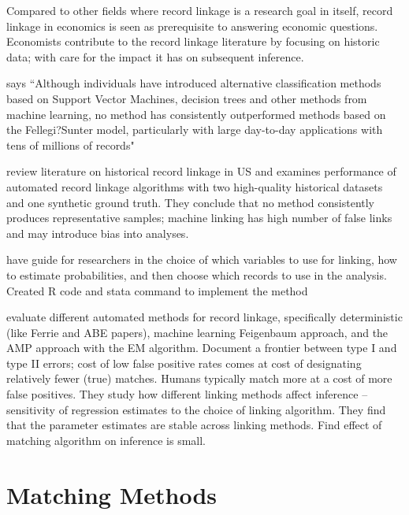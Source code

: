 \documentclass[12pt]{article}
\begin{document}
Compared to other fields where record linkage is a research goal in itself, record linkage in economics is seen as prerequisite to answering economic questions.  Economists contribute to the record linkage literature by focusing on historic data; with care for the impact it has on subsequent inference.   

\cite{christen2012} says ``Although individuals have introduced alternative classification methods based on Support Vector Machines, decision trees and other
methods from machine learning, no method has consistently outperformed methods
based on the Fellegi?Sunter model, particularly with large day-to-day applications
with tens of millions of records"

\cite{bailey2017} review literature on historical record linkage in US and examines performance of automated record linkage algorithms with two high-quality historical datasets and one synthetic ground truth.  They conclude that no method consistently produces representative samples; machine linking has high number of false links and may introduce bias into analyses.  

\cite{arp2018} have guide for researchers in the choice of which variables to use for linking, how to estimate probabilities, and then choose which records to use in the analysis.  Created R code and stata command to implement the method

\cite{abe2019} evaluate different automated methods for record linkage, specifically deterministic (like Ferrie and ABE papers), machine learning Feigenbaum approach, and the AMP approach with the EM algorithm.  Document a frontier between type I and type II errors; cost of low false positive rates comes at cost of designating relatively fewer (true) matches.  Humans typically match more at a cost of more false positives.  They study how different linking methods affect inference -- sensitivity of regression estimates to the choice of linking algorithm.  They find that the parameter estimates are stable across linking methods.  Find effect of matching algorithm on inference is small. 

\section{Matching Methods}
\end{document}
